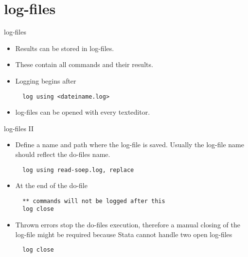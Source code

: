 \section{log-files}
\begin{frame}[fragile]{log-files}  
  \begin{itemize}
    \item Results can be stored in log-files.
    \item These contain all commands and their results.
    \item Logging begins after
    \begin{lstlisting}
  log using <dateiname.log>
    \end{lstlisting}
    \item log-files can be opened with every texteditor.
  \end{itemize}
\end{frame}

\begin{frame}[fragile]{log-files II}
  \begin{itemize}   
   \item Define a name and path where the log-file is saved. Usually the log-file name should reflect the do-files name.
   \begin{lstlisting}
  log using read-soep.log, replace
   \end{lstlisting}
   \item At the end of the do-file
   \begin{lstlisting}
  ** commands will not be logged after this
  log close
   \end{lstlisting}
   \item Thrown errors stop the do-files execution, therefore a manual closing of the log-file might be required because Stata cannot handle two open log-files
   \begin{lstlisting}
  log close
   \end{lstlisting}
  \end{itemize}
  
\end{frame}

